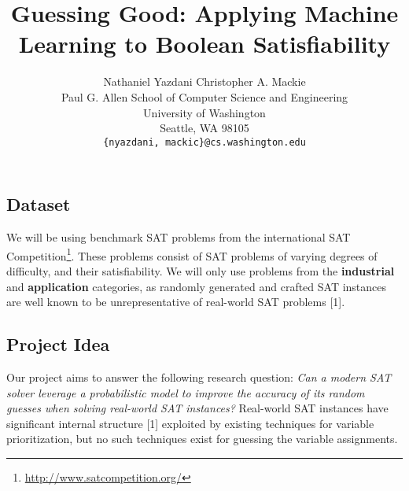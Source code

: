 \documentclass{article}
\title{Guessing Good: Applying Machine Learning to Boolean Satisfiability}
\author{
    Nathaniel Yazdani \quad Christopher A. Mackie\\
    Paul G. Allen School of Computer Science and Engineering\\
    University of Washington\\
    Seattle, WA 98105\\
    \texttt{\{nyazdani, mackic\}@cs.washington.edu}\\
}
\begin{document}

\maketitle


%

\subsection*{Dataset}

We will be using benchmark SAT problems from the international SAT
Competition\footnote{\url{http://www.satcompetition.org/}}. These problems
consist of SAT problems of varying degrees of difficulty, and their
satisfiability. We will only use problems from the \textbf{industrial} and
\textbf{application} categories, as randomly generated and crafted SAT instances
are well known to be unrepresentative of real-world SAT problems [1].

\subsection*{Project Idea}

Our project aims to answer the following research question: \emph{Can a modern
SAT solver leverage a probabilistic model to improve the accuracy of its random
guesses when solving real-world SAT instances?} Real-world SAT instances have
significant internal structure [1] exploited by existing techniques for variable
prioritization, but no such techniques exist for guessing the variable
assignments.
\end{document}
